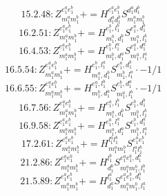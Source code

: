 \documentclass[letterpaper,10pt,fleqn,leqno,onecolumn]{article}
\begin{document}
\begin{equation} \;\;\;\;\;\;  15.2.48: Z^{e_{1}^{a}e_{1}^{b}}_{m_{1}^{a}m_{1}^{b}}+=H^{e_{1}^{a}e_{1}^{b}}_{d_{1}^{a}d_{1}^{b}}S^{d_{1}^{a}d_{1}^{b}}_{m_{1}^{a}m_{1}^{b}} \end{equation}
\begin{equation} \;\;\;\;\;\;  16.2.51: Z^{e_{1}^{a}e_{1}^{b}}_{m_{1}^{a}m_{1}^{b}}+=H^{e_{1}^{b},l_{1}^{b}}_{m_{1}^{b},d_{1}^{b}}S^{e_{1}^{a},d_{1}^{b}}_{m_{1}^{a},l_{1}^{b}} \end{equation}
\begin{equation} \;\;\;\;\;\;  16.4.53: Z^{e_{1}^{a}e_{1}^{b}}_{m_{1}^{a}m_{1}^{b}}+=H^{e_{1}^{b},l_{1}^{a}}_{m_{1}^{b},d_{1}^{a}}S^{e_{1}^{a},d_{1}^{a}}_{m_{1}^{a},l_{1}^{a}} \end{equation}
\begin{equation} \;\;\;\;\;\;  16.5.54: Z^{e_{1}^{a}e_{1}^{b}}_{m_{1}^{a}m_{1}^{b}}+=H^{e_{1}^{b},l_{1}^{a}}_{m_{1}^{a},d_{1}^{b}}S^{e_{1}^{a},d_{1}^{b}}_{m_{1}^{b},l_{1}^{a}}\cdot -1/1 \end{equation}
\begin{equation} \;\;\;\;\;\;  16.6.55: Z^{e_{1}^{a}e_{1}^{b}}_{m_{1}^{a}m_{1}^{b}}+=H^{e_{1}^{a},l_{1}^{b}}_{m_{1}^{b},d_{1}^{a}}S^{e_{1}^{b},d_{1}^{a}}_{m_{1}^{a},l_{1}^{b}}\cdot -1/1 \end{equation}
\begin{equation} \;\;\;\;\;\;  16.7.56: Z^{e_{1}^{a}e_{1}^{b}}_{m_{1}^{a}m_{1}^{b}}+=H^{e_{1}^{a},l_{1}^{b}}_{m_{1}^{a},d_{1}^{b}}S^{e_{1}^{b},d_{1}^{b}}_{m_{1}^{b},l_{1}^{b}} \end{equation}
\begin{equation} \;\;\;\;\;\;  16.9.58: Z^{e_{1}^{a}e_{1}^{b}}_{m_{1}^{a}m_{1}^{b}}+=H^{e_{1}^{a},l_{1}^{a}}_{m_{1}^{a},d_{1}^{a}}S^{e_{1}^{b},d_{1}^{a}}_{m_{1}^{b},l_{1}^{a}} \end{equation}
\begin{equation} \;\;\;\;\;\;  17.2.61: Z^{e_{1}^{a}e_{1}^{b}}_{m_{1}^{a}m_{1}^{b}}+=H^{l_{1}^{a}l_{1}^{b}}_{m_{1}^{a}m_{1}^{b}}S^{e_{1}^{a}e_{1}^{b}}_{l_{1}^{a}l_{1}^{b}} \end{equation}
\begin{equation} \;\;\;\;\;\;  21.2.86: Z^{e_{1}^{a}e_{1}^{b}}_{m_{1}^{a}m_{1}^{b}}+=H^{l_{1}^{b}}_{d_{1}^{b}}S^{e_{1}^{a}e_{1}^{b},d_{1}^{b}}_{m_{1}^{a}m_{1}^{b},l_{1}^{b}} \end{equation}
\begin{equation} \;\;\;\;\;\;  21.5.89: Z^{e_{1}^{a}e_{1}^{b}}_{m_{1}^{a}m_{1}^{b}}+=H^{l_{1}^{a}}_{d_{1}^{a}}S^{e_{1}^{a}e_{1}^{b},d_{1}^{a}}_{m_{1}^{a}m_{1}^{b},l_{1}^{a}} \end{equation}
\end{document}
